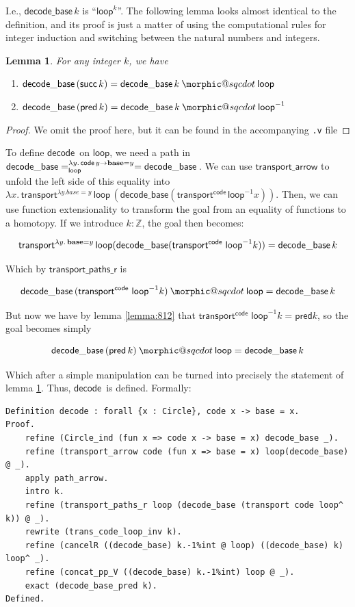 \documentclass[12 pt]{amsart}
\makeatletter
\newtheorem{lemma}[subsubsection]{Lemma}
\theoremstyle{definition}
\theoremstyle{remark}
\newcommand{\base}{\mathsf{\bf base}}
\newcommand{\lo}{\mathsf{ loop}}
\newcommand{\trans}{\mathsf{transport}}
\newcommand{\code}{{\mathsf{ code}\,}}
\newcommand{\decode}{{\mathsf{ decode}\,}}
\newcommand{\suc}{\mathsf{succ}}
\newcommand{\transportarrow}{\mathsf{transport\_arrow}}
\newcommand{\decodebase}{\mathsf{decode\_base}}
\newcommand{\pred}{\mathsf{pred}}
\newcommand{\transportpathsr}{\mathsf{transport\_paths\_r}}
\DeclareRobustCommand{\conc}{\mathbin{\mathpalette\morphic@sqcdot\relax}}
\newcommand{\morphic@sqcdot}[2]{%
    \sbox\z@{$\m@th#1\centerdot$}%
    \ht\z@=.33333\ht\z@
    \vcenter{\box\z@}%
    }
\makeatother
\begin{document}
I.e., $\decodebase\, k$ is ``$\lo^k$''. The following lemma looks almost identical to the definition, and its proof is just a matter of using the computational rules for integer induction and switching between the natural numbers and integers.

\begin{lemma} For any integer $k$, we have
\begin{enumerate}[label=\roman*)]
    \item $\decodebase\, (\suc\, k) = \decodebase\, k \conc \lo$
    \item $\decodebase\, (\pred\, k) = \decodebase\, k \conc \lo^{-1}$
\end{enumerate}
\label{lemma:incrdecr}
\end{lemma}
\begin{proof} We omit the proof here, but it can be found in the accompanying \texttt{.v} file
\end{proof}

To define $\decode$ on $\lo$, we need a path in $\decodebase = ^{\lambda y. \,\code y \to \base = y}_\lo = \decodebase\,$. We can use $\transportarrow$ to unfold the left side of this equality into $\lambda x. \,\trans^{\lambda y. base = y}\, \lo \, (\decodebase  (\trans^{\code} \lo^{-1} x))$. Then, we can use function extensionality to transform the goal from an equality of functions to a homotopy. If we introduce $k : \mathbb{Z}$, the goal then becomes:

\[ \trans^{\lambda y. \, \base = y} \, \lo (\decodebase (\trans^{\code}\, \lo^{-1} k)) = \decodebase \, k \]

Which by $\transportpathsr$ is

\[\decodebase \,(\trans^{\code}\, \lo^{-1} k) \conc \lo = \decodebase \, k\]

But now we have by lemma \ref{lemma:812} that $\trans^{\code}\, \lo^{-1} k = \pred k$, so the goal becomes simply 

\[\decodebase \, (\pred\, k) \conc \lo = \decodebase\, k\]

Which after a simple manipulation can be turned into precisely the statement of lemma \ref{lemma:incrdecr}. Thus, $\decode$ is defined. Formally:

\begin{lstlisting}
Definition decode : forall {x : Circle}, code x -> base = x.
Proof.
    refine (Circle_ind (fun x => code x -> base = x) decode_base _).
    refine (transport_arrow code (fun x => base = x) loop(decode_base)  @ _).
    apply path_arrow.
    intro k.
    refine (transport_paths_r loop (decode_base (transport code loop^ k)) @ _).
    rewrite (trans_code_loop_inv k).
    refine (cancelR ((decode_base) k.-1%int @ loop) ((decode_base) k) loop^ _).
    refine (concat_pp_V ((decode_base) k.-1%int) loop @ _).
    exact (decode_base_pred k).
Defined.
\end{lstlisting}
\end{document}
